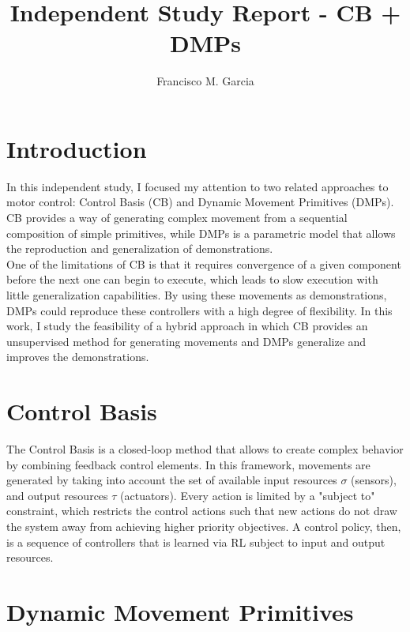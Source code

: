 \documentclass[a4paper]{article}
\begin{document}
\title{Independent Study Report - CB + DMPs}
\author{Francisco M. Garcia}

\maketitle


\section{Introduction}

\indent \indent In this independent study, I focused my attention to two related approaches to motor control: Control Basis (CB) and Dynamic Movement Primitives (DMPs). CB provides a way of generating complex movement from a sequential composition of simple primitives, while DMPs is a parametric model that allows the reproduction and generalization of demonstrations. \\
\indent One of the limitations of CB is that it requires convergence of a given component before the next one can begin to execute, which leads to slow execution with little generalization capabilities. By using these movements as demonstrations, DMPs could reproduce these controllers with a high degree of flexibility. In this work, I study the feasibility of a hybrid approach in which CB provides an unsupervised method for generating movements and DMPs generalize and improves the demonstrations.

\section{Control Basis}

\indent \indent The Control Basis is a closed-loop method that allows to create complex behavior by combining feedback control elements. In this framework, movements are generated by taking into account the set of available input resources $\sigma$ (sensors), and output resources $\tau$ (actuators). Every action is limited by a "subject to" constraint, which restricts the control actions such that new actions do not draw the system away from achieving higher priority objectives. A control policy, then, is a sequence of controllers that is learned via RL subject to input and output resources.    

\section{Dynamic Movement Primitives}
\end{document}
